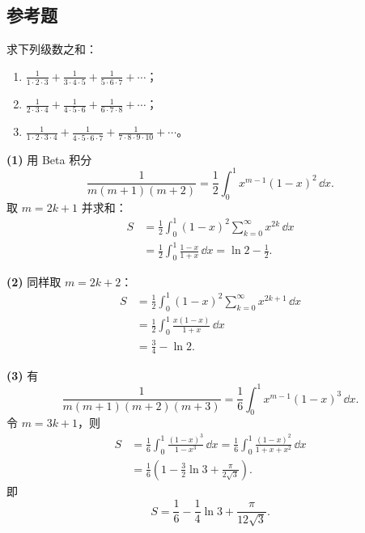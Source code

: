 \subsection{参考题}

\begin{xreferenceproblem}[1]
求下列级数之和：
\begin{enumerate}[label=(\arabic*)]
\item $\displaystyle\frac1{1\cdot2\cdot3}+\frac1{3\cdot4\cdot5}+\frac1{5\cdot6\cdot7}+\cdots$；
\item $\displaystyle\frac1{2\cdot3\cdot4}+\frac1{4\cdot5\cdot6}+\frac1{6\cdot7\cdot8}+\cdots$；
\item $\displaystyle\frac1{1\cdot2\cdot3\cdot4}+\frac1{4\cdot5\cdot6\cdot7}+\frac1{7\cdot8\cdot9\cdot10}+\cdots$。
\end{enumerate}
\end{xreferenceproblem}
\begin{xsolution}
\textbf{(1)}\quad
用 Beta 积分
\[
  \frac1{m(m+1)(m+2)}
  =\frac12\int_0^1x^{m-1}(1-x)^2\,\dd x.
\]
取 $m=2k+1$ 并求和：
\[
\begin{aligned}
S&=\frac12\int_0^1(1-x)^2\sum_{k=0}^{\infty}x^{2k}\,\dd x\\
 &=\frac12\int_0^1\frac{1-x}{1+x}\,\dd x
 =\ln2-\frac12.
\end{aligned}
\]

\textbf{(2)}\quad
同样取 $m=2k+2$：
\[
\begin{aligned}
S&=\frac12\int_0^1(1-x)^2\sum_{k=0}^{\infty}x^{2k+1}\,\dd x\\
 &=\frac12\int_0^1\frac{x(1-x)}{1+x}\,\dd x\\
 &=\frac34-\ln2.
\end{aligned}
\]

\textbf{(3)}\quad
有
\[
  \frac1{m(m+1)(m+2)(m+3)}
  =\frac16\int_0^1x^{m-1}(1-x)^3\,\dd x.
\]
令 $m=3k+1$，则
\[
\begin{aligned}
S&=\frac16\int_0^1\frac{(1-x)^3}{1-x^3}\,\dd x
 =\frac16\int_0^1\frac{(1-x)^2}{1+x+x^2}\,\dd x\\
 &=\frac16\left(1-\frac32\ln3+\frac{\pi}{2\sqrt3}\right).
\end{aligned}
\]
即
\[
  S=\frac16-\frac14\ln3+\frac{\pi}{12\sqrt3}.
\]
\end{xsolution}


